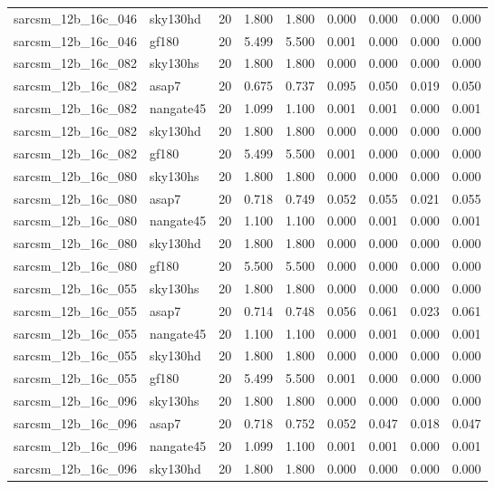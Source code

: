 \begin{tabular}{llrrrrrrr}
sarcsm\_12b\_16c\_046 & sky130hd & 20 & 1.800 & 1.800 & 0.000 & 0.000 & 0.000 & 0.000 \\
sarcsm\_12b\_16c\_046 & gf180 & 20 & 5.499 & 5.500 & 0.001 & 0.000 & 0.000 & 0.000 \\
sarcsm\_12b\_16c\_082 & sky130hs & 20 & 1.800 & 1.800 & 0.000 & 0.000 & 0.000 & 0.000 \\
sarcsm\_12b\_16c\_082 & asap7 & 20 & 0.675 & 0.737 & 0.095 & 0.050 & 0.019 & 0.050 \\
sarcsm\_12b\_16c\_082 & nangate45 & 20 & 1.099 & 1.100 & 0.001 & 0.001 & 0.000 & 0.001 \\
sarcsm\_12b\_16c\_082 & sky130hd & 20 & 1.800 & 1.800 & 0.000 & 0.000 & 0.000 & 0.000 \\
sarcsm\_12b\_16c\_082 & gf180 & 20 & 5.499 & 5.500 & 0.001 & 0.000 & 0.000 & 0.000 \\
sarcsm\_12b\_16c\_080 & sky130hs & 20 & 1.800 & 1.800 & 0.000 & 0.000 & 0.000 & 0.000 \\
sarcsm\_12b\_16c\_080 & asap7 & 20 & 0.718 & 0.749 & 0.052 & 0.055 & 0.021 & 0.055 \\
sarcsm\_12b\_16c\_080 & nangate45 & 20 & 1.100 & 1.100 & 0.000 & 0.001 & 0.000 & 0.001 \\
sarcsm\_12b\_16c\_080 & sky130hd & 20 & 1.800 & 1.800 & 0.000 & 0.000 & 0.000 & 0.000 \\
sarcsm\_12b\_16c\_080 & gf180 & 20 & 5.500 & 5.500 & 0.000 & 0.000 & 0.000 & 0.000 \\
sarcsm\_12b\_16c\_055 & sky130hs & 20 & 1.800 & 1.800 & 0.000 & 0.000 & 0.000 & 0.000 \\
sarcsm\_12b\_16c\_055 & asap7 & 20 & 0.714 & 0.748 & 0.056 & 0.061 & 0.023 & 0.061 \\
sarcsm\_12b\_16c\_055 & nangate45 & 20 & 1.100 & 1.100 & 0.000 & 0.001 & 0.000 & 0.001 \\
sarcsm\_12b\_16c\_055 & sky130hd & 20 & 1.800 & 1.800 & 0.000 & 0.000 & 0.000 & 0.000 \\
sarcsm\_12b\_16c\_055 & gf180 & 20 & 5.499 & 5.500 & 0.001 & 0.000 & 0.000 & 0.000 \\
sarcsm\_12b\_16c\_096 & sky130hs & 20 & 1.800 & 1.800 & 0.000 & 0.000 & 0.000 & 0.000 \\
sarcsm\_12b\_16c\_096 & asap7 & 20 & 0.718 & 0.752 & 0.052 & 0.047 & 0.018 & 0.047 \\
sarcsm\_12b\_16c\_096 & nangate45 & 20 & 1.099 & 1.100 & 0.001 & 0.001 & 0.000 & 0.001 \\
sarcsm\_12b\_16c\_096 & sky130hd & 20 & 1.800 & 1.800 & 0.000 & 0.000 & 0.000 & 0.000 \\

\end{tabular}
